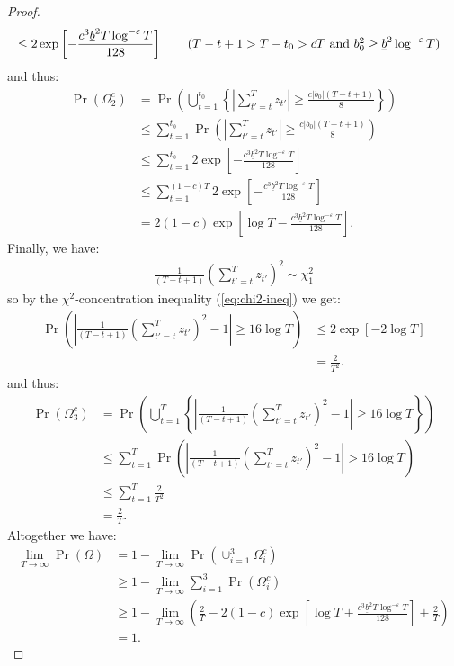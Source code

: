 \begin{proof}
\begin{align*}
    &\leq 2 \exp\left[- \frac{c^3\underline{b}^2T\log^{-\varepsilon}T}{128}\right] \tag{$T- t +1> T-t_0 > cT$ and $b_0^2 \geq \underline{b}^2\log^{-\varepsilon}T$}
\end{align*}
and thus:
\begin{align*}
    \Pr(\Omega^c_2) &= \Pr\left(\bigcup_{t=1}^{t_0} \left\{\left|\sum_{t'=t}^{T} z_{t'}\right| \geq \frac{c|b_0|(T-t+1)}{8}\right\} \right) \\
    &\leq \sum_{t=1}^{t_0} \Pr\left(\left|\sum_{t'=t}^{T} z_{t'}\right| \geq \frac{c|b_0|(T-t+1)}{8}\right)\tag{union bound} \\
    &\leq \sum_{t=1}^{t_0}  2 \exp\left[- \frac{c^3\underline{b}^2T\log^{-\varepsilon}T}{128}\right] \\
    &\leq \sum_{t=1}^{(1-c)T} 2 \exp\left[- \frac{c^3\underline{b}^2T\log^{-\varepsilon}T}{128}\right] \tag{$t_0 < (1-c)T$}  \\
    &= 2 (1-c)\exp\left[\log T- \frac{c^3\underline{b}^2T\log^{-\varepsilon}T}{128}\right].
\end{align*}
Finally, we have:
\begin{align*}
    \frac{1}{(T-t+1)}\left(\sum_{t'=t}^{T} z_{t'}\right)^2 \sim \chi_1^2
\end{align*}
so by the $\chi^2$-concentration inequality (\ref{eq:chi2-ineq}) we get: 
\begin{align*}
    \Pr\left(\left|\frac{1}{(T-t+1)}\left(\sum_{t'=t}^{T} z_{t'}\right)^2 - 1\right| \geq 16 \log T\right) &\leq 2\exp\left[-2\log T\right] \\
    &= \frac{2}{T^2}.
\end{align*}
and thus:
\begin{align*}
    \Pr(\Omega^c_3) &= \Pr\left(\bigcup_{t=1}^T \left\{\left|\frac{1}{(T-t+1)}\left(\sum_{t'=t}^{T} z_{t'}\right)^2 - 1\right| \geq 16 \log T\right\} \right) \\
    &\leq \sum_{t = 1}^{T} \Pr\left(\left|\frac{1}{(T-t+1)}\left(\sum_{t'=t}^{T} z_{t'}\right)^2 - 1\right| > 16 \log T\right) \tag{union bound} \\
    &\leq \sum_{t = 1}^{T} \frac{2}{T^2} \\
    &= \frac{2}{T}.
\end{align*}
Altogether we have:
\begin{align*}
    \lim_{T\to\infty} \Pr(\Omega) &= 1 - \lim_{T\to\infty} \Pr(\cup_{i=1}^3 \Omega_i^c) \\
    &\geq 1 - \lim_{T\to\infty} \sum_{i=1}^3 \Pr(\Omega_i^c) \tag{union bound} \\
    &\geq 1 -  \lim_{T\to\infty} \left(\frac{2}{T} - 2 (1-c)\exp\left[\log T+ \frac{c^3\underline{b}^2T\log^{-\varepsilon}T}{128}\right] + \frac{2}{T}\right) \\
    &= 1.
\end{align*}
\end{proof}
